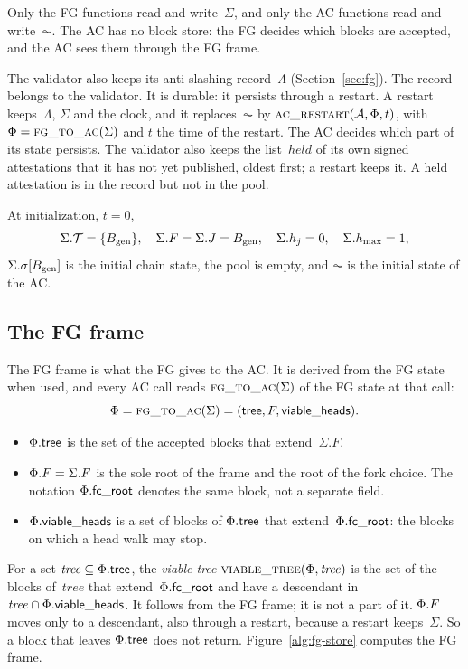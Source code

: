 Only the FG functions read and write~$\Sigma$, and only the AC functions
read and write~$\AC$.  The AC has no block store: the FG decides which
blocks are accepted, and the AC sees them through the FG frame.

The validator also keeps its anti-slashing record~$\Lambda$
(Section~\ref{sec:fg}).  The record belongs to the validator.  It is
durable: it persists through a restart.  A restart keeps~$\Lambda$,
$\Sigma$ and the clock, and it replaces~$\AC$ by
$\Call{ac\_restart}{\AC,\Fr,t}$, with $\Fr=\Call{fg\_to\_ac}{\Sigma}$
and $t$ the time of the restart.  The AC decides which part of its state
persists.  The validator also keeps the list~$\mathit{held}$ of its own
signed attestations that it has not yet published, oldest first; a restart
keeps it.  A held attestation is in the record but not in the pool.

At initialization, $t=0$,
\[
 \Sigma.\mathcal T=\{B_{\mathrm{gen}}\},\quad
 \Sigma.F=\Sigma.J=B_{\mathrm{gen}},\quad \Sigma.h_j=0,\quad \Sigma.h_{\max}=1,
\]
$\Sigma.\sigma[B_{\mathrm{gen}}]$ is the initial chain state, the pool is empty,
and $\AC$ is the initial state of the AC.

\subsection{The FG frame}\label{sec:frame}

The FG frame is what the FG gives to the AC.  It is derived from the FG
state when used, and every AC call reads $\Call{fg\_to\_ac}{\Sigma}$ of the
FG state at that call:
\[
 \Fr=\Call{fg\_to\_ac}{\Sigma}=(\tree,F,\allowed).
\]
\begin{itemize}
\item $\Phi.\mathsf{tree}$ is the set of the accepted blocks that
  extend~$\Sigma.F$.
\item $\Phi.F=\Sigma.F$ is the sole root of the frame and the root of the fork
  choice. The notation $\Phi.\mathsf{fc\_root}$ denotes the same block, not a separate field.
\item $\Phi.\mathsf{viable\_heads}$ is a set of blocks of $\Phi.\mathsf{tree}$ that
  extend~$\Phi.\mathsf{fc\_root}$: the blocks on which a head walk may stop.
\end{itemize}
For a set $\mathit{tree}\subseteq\Phi.\mathsf{tree}$, the \emph{viable tree}
$\text{\textsc{viable\_tree}}(\Phi,\mathit{tree})$ is the set of the blocks of~$\mathit{tree}$
that extend~$\Phi.\mathsf{fc\_root}$ and have a descendant in
$\mathit{tree}\cap\Phi.\mathsf{viable\_heads}$.  It follows from the FG frame; it is not a
part of it.
$\Phi.F$ moves only to a descendant, also through a restart, because a
restart keeps~$\Sigma$.  So a block that leaves $\Phi.\mathsf{tree}$ does not
return.  Figure~\ref{alg:fg-store} computes the FG frame.


